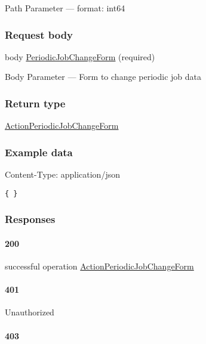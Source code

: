 {Path Parameter} --- format: int64

\hypertarget{request-body-4}{%
\subsubsection*{Request body}\label{request-body-4}}

body \protect\hyperlink{PeriodicJobChangeForm}{PeriodicJobChangeForm}
(required)

{Body Parameter} --- Form to change periodic job data

\hypertarget{return-type-12}{%
\subsubsection*{Return type}\label{return-type-12}}

\protect\hyperlink{ActionPeriodicJobChangeForm}{ActionPeriodicJobChangeForm}

\hypertarget{example-data-12}{%
\subsubsection*{Example data}\label{example-data-12}}

Content-Type: application/json

\begin{verbatim}
{ }
\end{verbatim}

\hypertarget{responses-12}{%
\subsubsection*{Responses}\label{responses-12}}

\hypertarget{section-44}{%
\paragraph{200}\label{section-44}}

successful operation
\protect\hyperlink{ActionPeriodicJobChangeForm}{ActionPeriodicJobChangeForm}

\hypertarget{section-45}{%
\paragraph{401}\label{section-45}}

Unauthorized \protect\hyperlink{}{}

\hypertarget{section-46}{%
\paragraph{403}\label{section-46}}

